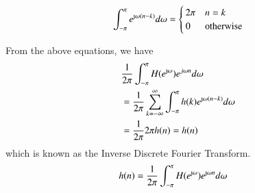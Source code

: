 \documentclass[journal,12pt,twocolumn]{IEEEtran}
\renewcommand\thesection{\arabic{section}}
\begin{document}
\begin{enumerate}[label=\thesection.\arabic*]
\begin{align}
	\int_{-\pi}^{\pi}e^{\text{\j}\omega(n - k)}d\omega =
	\begin{cases}
		2\pi & n = k \\
		0 & \textrm{otherwise}
	\end{cases}
\end{align}

From the above equations, we have 
\begin{align}
	&\frac{1}{2\pi}\int_{-\pi}^{\pi}H(e^{\text{\j}\omega})e^{j\omega n}d\omega \\
	&= \frac{1}{2\pi}\sum_{k = -\infty}^{\infty}\int_{-\pi}^{\pi}h(k)e^{\text{\j}\omega(n - k)}d\omega \\
	&= \frac{1}{2\pi}2\pi h(n) = h(n)
\end{align}
which is known as the Inverse Discrete Fourier Transform. 
\begin{align}
 	h(n) &= \frac{1}{2\pi}\int_{-\pi}^{\pi}H(e^{\text{\j}\omega})e^{\text{\j}\omega n}d\omega 
\end{align}
\end{enumerate}
\end{document}
